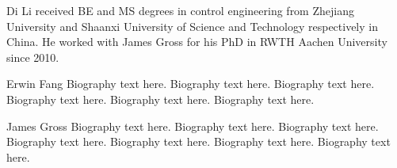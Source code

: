 \documentclass[10pt,journal,compsoc]{IEEEtran}
\theoremstyle{mytheoremstyle}
\theoremstyle{mytheoremstyle}
\theoremstyle{mytheoremstyle}
\begin{document}

%
%
%










% 
\begin{IEEEbiography}{Di Li}
received BE and MS degrees in control engineering from Zhejiang University and Shaanxi University of Science and Technology respectively in China.
He worked with James Gross for his PhD in RWTH Aachen University since 2010.
\end{IEEEbiography}

\begin{IEEEbiography}{Erwin Fang}
Biography text here.
Biography text here.
Biography text here.
Biography text here.
Biography text here.
Biography text here.

\end{IEEEbiography}

\begin{IEEEbiography}{James Gross}
Biography text here.
Biography text here.
Biography text here.
Biography text here.
Biography text here.
Biography text here.
Biography text here.

\end{IEEEbiography}
\end{document}
